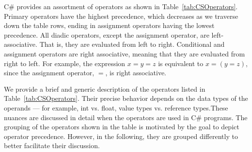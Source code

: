 C\# provides an assortment of operators as shown in
Table~\ref{tab:CSOperators}. Primary operators have the highest
precedence, which decreases as we traverse down the table rows,
ending in assignment operators having the lowest precedence. All
diadic operators, except the assignment operator, are
left-associative. That is, they are evaluated from left to right.
Conditional and assignment operators are right associative,
meaning that they are evaluated from right to left. For example,
the expression $x=y=z$ is equivalent to $x=(y=z)$, since the
assignment operator, $=$, is right associative.


We provide a brief and generic  description of the operators
listed in Table~\ref{tab:CSOperators}. Their precise behavior
depends on the data types of the operands --- for example, int vs.
float, value types vs. reference types.These nuances are discussed
in detail when the operators are used in C\# programs. The
grouping of the operators shown in the table is motivated by the
goal to depict operator precedence. However, in the following,
they are grouped differently to better facilitate their
discussion.


